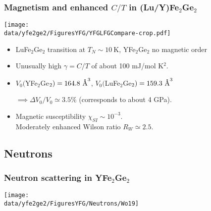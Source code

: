 

\begin{frame}[label=YFGIntro2]
  \frametitle{Magnetism and enhanced $C/T$ in  (Lu/Y)Fe$_2$Ge$_2$}
  \centerline{\texttt{[image: \\data/yfe2ge2/FiguresYFG/YFGLFGCompare-crop.pdf]}}
  \begin{itemize} %
  \item LuFe$_2$Ge$_2$ transition at $T_N \sim \SI{10}{\kelvin}$, YFe$_2$Ge$_2$ no magnetic order
  \item
  Unusually high $\gamma = C/T$ of about 100 mJ/mol K$^2$.
  \item
  $V_0 ($YFe$_2$Ge$_2) = 164.8 ~\mbox{\AA}^3$, $V_0 ($LuFe$_2$Ge$_2) =
  159.3 ~\mbox{\AA}^3$ 
  
  \hfill $\implies \Delta V_0/V_0 \simeq 3.5 \%$
  (corresponds to about 4 GPa).
  
  \item
  Magnetic susceptibility $\chi_{SI} \sim 10^{-3}$. \\ Moderately enhanced Wilson ratio $R_W \simeq 2.5$.
  
  
  \end{itemize}
  \end{frame}

\subsection{Neutrons}
\begin{frame}[label=YFGNeutrons]
\frametitle{Neutron scattering in YFe$_2$Ge$_2$}
\centerline{\texttt{[image: \\data/yfe2ge2/FiguresYFG/Neutrons/Wo19]}}

\end{frame}



